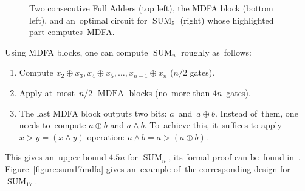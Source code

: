 \documentclass[sigconf, review, anonymous]{acmart}
\DeclareMathOperator{\SUM}{SUM}
\DeclareMathOperator{\MDFA}{MDFA}
\begin{document}
\begin{figure}
\begin{center}
    \end{center}
    \caption{Two consecutive Full Adders (top left), the MDFA block (bottom left), and an~optimal circuit for $\SUM_5$ (right) whose highlighted part computes~MDFA.}
    \label{figure:mdfa}
\end{figure}

Using MDFA blocks, one can compute $\SUM_n$ roughly as~follows:
\begin{enumerate}
    \item Compute $x_2 \oplus x_3, x_4 \oplus x_5, \dotsc, x_{n-1} \oplus x_n$ ($n/2$ gates).
    \item Apply at~most~$n/2$ $\MDFA$ blocks (no~more than $4n$~gates).
    \item The last MDFA block outputs two bits: $a$~and~$a\oplus b$. Instead of~them, one needs to~compute $a \oplus b$ and $a \land b$. To~achieve this,
    it~suffices to apply $x>y=(x \land \overline{y})$ operation:
    \(a \land b = a>(a \oplus b)\).
\end{enumerate}
This gives an~upper bound $4.5n$ for $\SUM_n$, its formal proof can
be~found in~\cite{DBLP:journals/ipl/DemenkovKKY10}. Figure~\ref{figure:sum17mdfa} gives an~example of~the corresponding design
for~$\SUM_17$.
\end{document}
